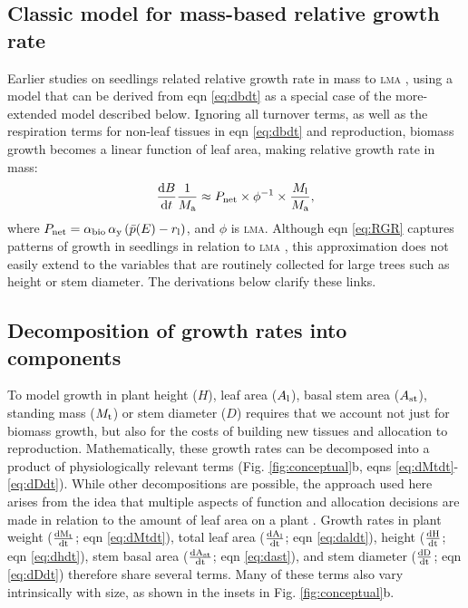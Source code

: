 \documentclass[9pt,twocolumn,twoside,lineno]{pnas-new}
\newcommand{\ud}{\ensuremath{\rm{d}}}
\newcommand{\lma}{\textsc{lma}}
\begin{document}
\subsection{Classic model for mass-based relative growth rate}

Earlier studies on seedlings related relative growth rate in mass to {\lma} \citep{Blackman-1919, Lambers-1992, Cornelissen-1996, Wright-2000}, using a model that can be derived from eqn \ref{eq:dbdt} as a special case of the more-extended model described below. Ignoring all turnover terms, as well as the respiration terms for non-leaf tissues in eqn \ref{eq:dbdt} and reproduction, biomass growth becomes a linear function of leaf area, making relative growth rate in mass:
\begin{equation}\label{eq:RGR}
\frac{{\rm d}B}{{\rm d}t}\frac{1}{M_{\rm a}}  \approx P_{\rm net} \times \phi^{-1} \times \frac{M_{\rm l}}{M_{\rm a}}, \end{equation}
where $P_{\rm net} = \alpha_{\rm bio} \, \alpha_{\rm y}\,(\bar{p}(E) - r_{\rm l})$, and $\phi$ is {\lma}. Although eqn \ref{eq:RGR} captures patterns of growth in seedlings in relation to {\lma} \citep{Wright-2000}, this approximation does not easily extend to the variables that are routinely collected for large trees such as height or stem diameter. The derivations below clarify these links.

\subsection{Decomposition of growth rates into components}

\label{eq:dbdt_2}
\label{eq:dMtdt}
\label{eq:daldmt}
\label{eq:daldt}
\label{eq:dhdt}
\label{eq:dast}
\label{eq:dDdt}


To model growth in plant height ($H$), leaf area ($A_{\rm l}$), basal stem area ($ A_{\rm st}$), standing mass ($M_{\rm t}$) or stem diameter ($D$) requires that we account not just for biomass growth, but also for the costs of building new tissues and allocation to reproduction. Mathematically, these growth rates can be decomposed into a product of physiologically relevant terms \citep{Falster-2011, Gibert-2016} (Fig. \ref{fig:conceptual}b, eqns \ref{eq:dMtdt}-\ref{eq:dDdt}). While other decompositions are possible, the approach used here arises from the idea that multiple aspects of function and allocation decisions are made in relation to the amount of leaf area on a plant  \citep{Falster-2011}. Growth rates in plant weight ($\frac{\ud M_{\rm t} }{\ud t}$; eqn \ref{eq:dMtdt}), total leaf area ($\frac{\ud A_{\rm l}}{\ud t}$; eqn \ref{eq:daldt}), height ($\frac{\ud H}{\ud t}$; eqn \ref{eq:dhdt}), stem basal area ($\frac{\ud  A_{\rm st}}{\ud t}$; eqn \ref{eq:dast}), and stem diameter ($\frac{\ud D}{\ud t}$; eqn \ref{eq:dDdt}) therefore share several terms. Many of these terms also vary intrinsically with size, as shown in the insets in Fig. \ref{fig:conceptual}b.
\end{document}
